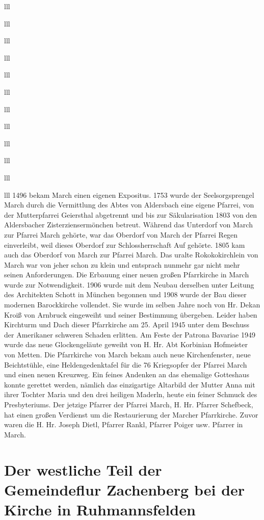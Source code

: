 \documentclass[12pt,a4pager]{book}
\begin{document}
\begin{tabuluar}{lll}
\begin{tabuluar}{lll}
\begin{tabuluar}{lll}
\begin{tabuluar}{lll}
\begin{tabuluar}{lll}
\begin{tabuluar}{lll}
\begin{tabuluar}{lll}
\begin{tabuluar}{lll}
\begin{tabuluar}{lll}
\begin{tabuluar}{lll}
\begin{tabuluar}{lll}
\begin{tabuluar}{lll}
1496 bekam March einen eigenen Expositus. 1753 wurde der Seelsorgsprengel March
durch die Vermittlung des Abtes von Aldersbach eine eigene Pfarrei, von der
Mutterpfarrei Geiersthal abgetrennt und bis zur Säkularisation 1803 von den
Aldersbacher Zisterziensermönchen betreut. Während das Unterdorf von March zur
Pfarrei March gehörte, war das Oberdorf von March der Pfarrei Regen einverleibt,
weil dieses Oberdorf zur Schlossherrschaft Auf gehörte. 1805 kam auch das
Oberdorf von March zur Pfarrei March. Das uralte Rokokokirchlein von March war
von jeher schon zu klein und entsprach nunmehr gar nicht mehr seinen
Anforderungen. Die Erbauung einer neuen großen Pfarrkirche in March wurde zur
Notwendigkeit. 1906 wurde mit dem Neubau derselben unter Leitung des Architekten
Schott in München begonnen und 1908 wurde der Bau dieser modernen Barockkirche
vollendet. Sie wurde im selben Jahre noch von Hr. Dekan Kroiß von Arnbruck
eingeweiht und seiner Bestimmung übergeben. Leider haben Kirchturm und Dach
dieser Pfarrkirche am 25. April 1945 unter dem Beschuss der Amerikaner schweren
Schaden erlitten. Am Feste der Patrona Bavariae 1949 wurde das neue
Glockengeläute geweiht von H. Hr. Abt Korbinian Hofmeister von Metten. Die
Pfarrkirche von March bekam auch neue Kirchenfenster, neue Beichtstühle, eine
Heldengedenktafel für die 76 Kriegsopfer der Pfarrei March und einen neuen
Kreuzweg. Ein feines Andenken an das ehemalige Gotteshaus konnte gerettet
werden, nämlich das einzigartige Altarbild der Mutter Anna mit ihrer Tochter
Maria und den drei heiligen Maderln, heute ein feiner Schmuck des Presbyteriums.
Der jetzige Pfarrer der Pfarrei March, H. Hr. Pfarrer Schefbeck, hat einen
großen Verdienst um die Restaurierung der Marcher Pfarrkirche. Zuvor waren die
H. Hr. Joseph Dietl, Pfarrer Rankl, Pfarrer Poiger usw. Pfarrer in March.

\section{Der westliche Teil der Gemeindeflur Zachenberg bei der Kirche in
Ruhmannsfelden}


\end{tabuluar}
\end{tabuluar}
\end{tabuluar}
\end{tabuluar}
\end{tabuluar}
\end{tabuluar}
\end{tabuluar}
\end{tabuluar}
\end{tabuluar}
\end{tabuluar}
\end{tabuluar}
\end{tabuluar}
\end{document}
